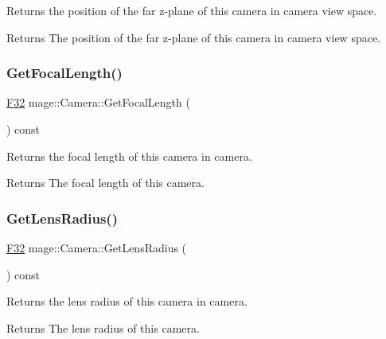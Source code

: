 Returns the position of the far z-\/plane of this camera in camera view space.

\begin{DoxyReturn}{Returns}
The position of the far z-\/plane of this camera in camera view space. 
\end{DoxyReturn}
\hypertarget{classmage_1_1_camera_a473908b18eb0d9d011eb789c9138fffb}{}\label{classmage_1_1_camera_a473908b18eb0d9d011eb789c9138fffb} 
\subsubsection{\texorpdfstring{Get\+Focal\+Length()}{GetFocalLength()}}
{\footnotesize\ttfamily \hyperlink{namespacemage_aa97e833b45f06d60a0a9c4fc22ae02c0}{F32} mage\+::\+Camera\+::\+Get\+Focal\+Length (\begin{DoxyParamCaption}{ }\end{DoxyParamCaption}) const\hspace{0.3cm}{\ttfamily [noexcept]}}

Returns the focal length of this camera in camera.

\begin{DoxyReturn}{Returns}
The focal length of this camera. 
\end{DoxyReturn}
\hypertarget{classmage_1_1_camera_a7c3890887fc155ab275321b962744e80}{}\label{classmage_1_1_camera_a7c3890887fc155ab275321b962744e80} 
\subsubsection{\texorpdfstring{Get\+Lens\+Radius()}{GetLensRadius()}}
{\footnotesize\ttfamily \hyperlink{namespacemage_aa97e833b45f06d60a0a9c4fc22ae02c0}{F32} mage\+::\+Camera\+::\+Get\+Lens\+Radius (\begin{DoxyParamCaption}{ }\end{DoxyParamCaption}) const\hspace{0.3cm}{\ttfamily [noexcept]}}

Returns the lens radius of this camera in camera.

\begin{DoxyReturn}{Returns}
The lens radius of this camera. 
\end{DoxyReturn}
\hypertarget{classmage_1_1_camera_a92714d8092aa5230771b8f3452f6f969}{}\label{classmage_1_1_camera_a92714d8092aa5230771b8f3452f6f969} 
